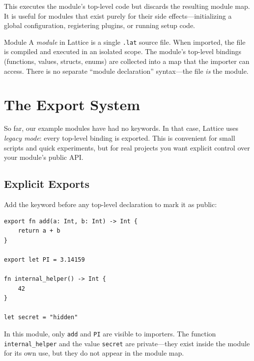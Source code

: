 This executes the module's top-level code but discards the resulting module map.
It is useful for modules that exist purely for their side effects---initializing a global configuration, registering plugins, or running setup code.

\begin{defnbox}{Module}
A \emph{module} in Lattice is a single \texttt{.lat} source file.
When imported, the file is compiled and executed in an isolated scope.
The module's top-level bindings (functions, values, structs, enums) are collected into a map that the importer can access.
There is no separate ``module declaration'' syntax---the file \emph{is} the module.
\end{defnbox}

\section{The Export System}\label{sec:export-system}

So far, our example modules have had no  keywords.
In that case, Lattice uses \emph{legacy mode}: every top-level binding is exported.
This is convenient for small scripts and quick experiments, but for real projects you want explicit control over your module's public API\@.

\subsection{Explicit Exports}\label{subsec:explicit-exports}

Add the  keyword before any top-level declaration to mark it as public:

\begin{lstlisting}[language=Lattice, caption={export\_explicit.lat --- explicit exports}]
export fn add(a: Int, b: Int) -> Int {
    return a + b
}

export let PI = 3.14159

fn internal_helper() -> Int {
    42
}

let secret = "hidden"
\end{lstlisting}

In this module, only \lstinline|add| and \lstinline|PI| are visible to importers.
The function \lstinline|internal_helper| and the value \lstinline|secret| are private---they exist inside the module for its own use, but they do not appear in the module map.


